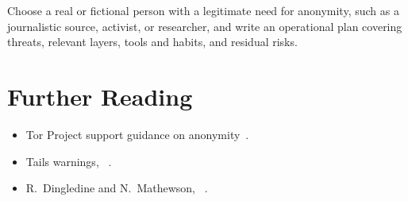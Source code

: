 \begin{esercizio}[3]\label{es:28-modello}
Choose a real or fictional person with a legitimate need for anonymity, such as a journalistic source, activist, or researcher, and write an operational plan covering threats, relevant layers, tools and habits, and residual risks.
\end{esercizio}

\section*{Further Reading}
\begin{itemize}
  \item Tor Project support guidance on anonymity~\cite{torsafety}.
  \item Tails warnings, ~\cite{tailswarnings}.
  \item R.~Dingledine and N.~Mathewson, ~\cite{dingledine2006company}.
\end{itemize}
